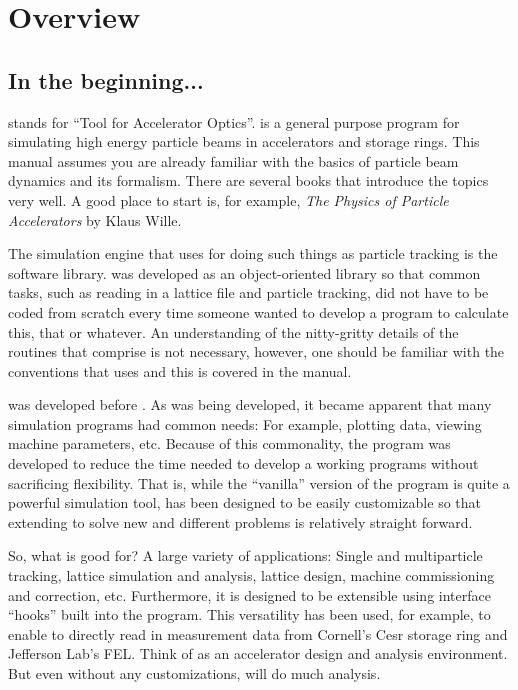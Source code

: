 \chapter{Overview}
\label{c:overview}

\section{In the beginning...}
\label{s:overview}


\tao stands for ``Tool for Accelerator Optics''. \tao is a general purpose program for simulating
high energy particle beams in accelerators and storage rings. This manual assumes you are already
familiar with the basics of particle beam dynamics and its formalism. There are several books that
introduce the topics very well. A good place to start is, for example, \textit{The Physics of
Particle Accelerators} by Klaus Wille\cite{b:wille}.

The simulation engine that \tao uses for doing such things as particle tracking is the \bmad
software library\cite{b:bmad}. \bmad was developed as an object-oriented library so that common
tasks, such as reading in a lattice file and particle tracking, did not have to be coded from
scratch every time someone wanted to develop a program to calculate this, that or whatever.  An
understanding of the nitty-gritty details of the routines that comprise \bmad is not necessary,
however, one should be familiar with the conventions that \bmad uses and this is covered in the
\bmad manual.

\bmad was developed before \tao. As \bmad was being developed, it became apparent that many
simulation programs had common needs: For example, plotting data, viewing machine parameters,
etc. Because of this commonality, the \tao program was developed to reduce the time needed to
develop a working programs without sacrificing flexibility. That is, while the ``vanilla'' version
of the \tao program is quite a powerful simulation tool, \tao has been designed to be easily
customizable so that extending \tao to solve new and different problems is relatively straight
forward.

So, what is \tao good for? A large variety of applications: Single and multiparticle tracking,
lattice simulation and analysis, lattice design, machine commissioning and correction,
etc. Furthermore, it is designed to be extensible using interface ``hooks'' built into the program.
This versatility has been used, for example, to enable \tao to directly read in measurement data
from Cornell's Cesr storage ring and Jefferson Lab's FEL. Think of \tao as an accelerator design and
analysis environment. But even without any customizations, \tao will do much analysis.

